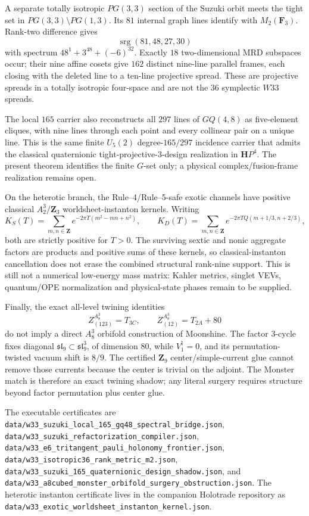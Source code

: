 A separate totally isotropic $PG(3,3)$ section of the Suzuki orbit meets the tight set in $PG(3,3)\setminus PG(1,3)$.  Its $81$ internal graph lines identify with $M_2(\mathbf F_3)$.  Rank-two difference gives
\[
 \operatorname{srg}(81,48,27,30)
\]
with spectrum $48^1+3^{48}+(-6)^{32}$.  Exactly $18$ two-dimensional MRD subspaces occur; their nine affine cosets give $162$ distinct nine-line parallel frames, each closing with the deleted line to a ten-line projective spread.  These are projective spreads in a totally isotropic four-space and are not the $36$ symplectic $W33$ spreads.

The local $165$ carrier also reconstructs all $297$ lines of $GQ(4,8)$ as five-element cliques, with nine lines through each point and every collinear pair on a unique line.  This is the same finite $U_5(2)$ degree-$165/297$ incidence carrier that admits the classical quaternionic tight-projective-$3$-design realization in $\mathbf H P^4$.  The present theorem identifies the finite $G$-set only; a physical complex/fusion-frame realization remains open.

On the heterotic branch, the Rule--4/Rule--5-safe exotic channels have positive classical $A_2^3/\mathbf Z_3$ worldsheet-instanton kernels.  Writing
\[
 K_S(T)=\sum_{m,n\in\mathbf Z}e^{-2\pi T(m^2-mn+n^2)},\qquad
 K_D(T)=\sum_{m,n\in\mathbf Z}e^{-2\pi TQ(m+1/3,n+2/3)},
\]
both are strictly positive for $T>0$.  The surviving sextic and nonic aggregate factors are products and positive sums of these kernels, so classical-instanton cancellation does not erase the combined structural rank-nine support.  This is still not a numerical low-energy mass matrix: Kahler metrics, singlet VEVs, quantum/OPE normalization and physical-state phases remain to be supplied.

Finally, the exact all-level twining identities
\[
 Z^{A_8^3}_{(123)}=T_{3C},\qquad
 Z^{A_8^3}_{(12)}=T_{2A}+80
\]
do not imply a direct $A_8^3$ orbifold construction of Moonshine.  The factor $3$-cycle fixes diagonal $\mathfrak{sl}_9\subset\mathfrak{sl}_9^3$, of dimension $80$, while $V^\natural_1=0$, and its permutation-twisted vacuum shift is $8/9$.  The certified $\mathbf Z_9$ center/simple-current glue cannot remove those currents because the center is trivial on the adjoint.  The Monster match is therefore an exact twining shadow; any literal surgery requires structure beyond factor permutation plus center glue.

The executable certificates are
\texttt{data/w33\_suzuki\_local\_165\_gq48\_spectral\_bridge.json},
\texttt{data/w33\_suzuki\_refactorization\_compiler.json},
\texttt{data/w33\_e6\_tritangent\_pauli\_holonomy\_frontier.json},
\texttt{data/w33\_isotropic36\_rank\_metric\_m2.json},
\texttt{data/w33\_suzuki\_165\_quaternionic\_design\_shadow.json}, and
\texttt{data/w33\_a8cubed\_monster\_orbifold\_surgery\_obstruction.json}.
The heterotic instanton certificate lives in the companion Holotrade repository as
\texttt{data/w33\_exotic\_worldsheet\_instanton\_kernel.json}.
